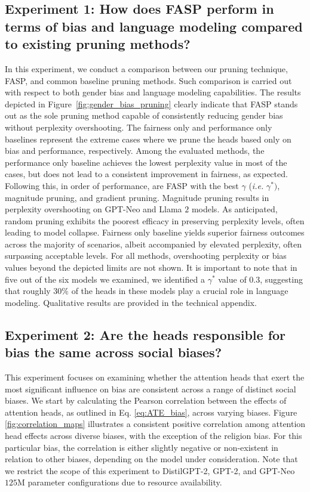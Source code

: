\documentclass[letterpaper]{article} %
\newcommand{\goncalo}[1]
{\textcolor{orange}{{\bf}{\em #1}{\bf}}}
\begin{document}
\subsection{Experiment 1: How does FASP perform in terms of bias and language modeling compared to existing pruning methods?}
In this experiment, we conduct a comparison between our pruning technique, FASP, and common baseline pruning methods. Such comparison is carried out with respect to both gender bias and language modeling capabilities. The results depicted in Figure~\ref{fig:gender_bias_pruning} clearly indicate that FASP stands out as the sole pruning method capable of consistently reducing gender bias without perplexity overshooting. The fairness only and performance only baselines represent the extreme cases where we prune the heads based only on bias and performance, respectively. Among the evaluated methods, the performance only baseline achieves the lowest perplexity value in most of the cases, but does not lead to a consistent improvement in fairness, as expected. Following this, in order of performance, are FASP with the best $\gamma$ (\textit{i.e.} $\gamma^*)$, magnitude pruning, and gradient pruning. Magnitude pruning results in perplexity overshooting on GPT-Neo and Llama $2$ models. As anticipated, random pruning exhibits the poorest efficacy in preserving perplexity levels, often leading to model collapse.
Fairness only baseline yields superior fairness outcomes across the majority of scenarios, albeit accompanied by elevated perplexity, often surpassing acceptable levels. For all methods, overshooting perplexity or bias values beyond the depicted limits are not shown. It is important to note that in five out of the six models we examined, we identified a $\gamma^*$ value of $0.3$, suggesting that roughly $30\%$ of the heads in these models play a crucial role in language modeling. Qualitative results are provided in the technical appendix. %

\subsection{Experiment 2: Are the heads responsible for bias the same across social biases?}
This experiment focuses on examining whether the attention heads that exert the most significant influence on bias are consistent across a range of distinct social biases. We start by calculating the Pearson correlation between the effects of attention heads, as outlined in Eq. \eqref{eq:ATE_bias}, across varying biases. Figure \ref{fig:correlation_maps} illustrates a consistent positive correlation among attention head effects across diverse biases, with the exception of the religion bias. For this particular bias, the correlation is either slightly negative or non-existent in relation to other biases, depending on the model under consideration. Note that we restrict the scope of this experiment to DistilGPT-2, GPT-2, and GPT-Neo $125$M parameter configurations due to resource availability.
\end{document}
